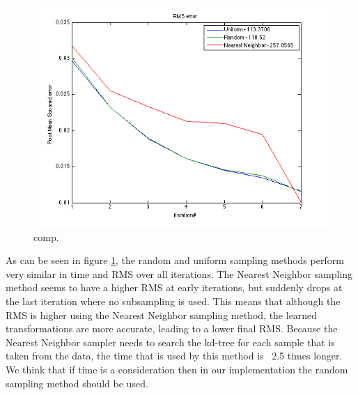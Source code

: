 \documentclass[12pt]{amsart}
\begin{document}
\begin{figure}[H]
\center
\includegraphics[scale=0.5]{images/comparison.png}
\caption{comp.}
\label{comp}
\end{figure}

As can be seen in figure \ref{comp}, the random and uniform sampling methods perform very similar in time and RMS over all iterations. The Nearest Neighbor sampling method seems to have a higher RMS at early iterations, but suddenly drops at the last iteration where no subsampling is used. This means that although the RMS is higher using the Nearest Neighbor sampling method, the learned transformations are more accurate, leading to a lower final RMS. Because the Nearest Neighbor sampler needs to search the kd-tree for each sample that is taken from the data, the time that is used by this method is ~2.5 times longer. We think that if time is a consideration then in our implementation the random sampling method should be used.
\end{document}
